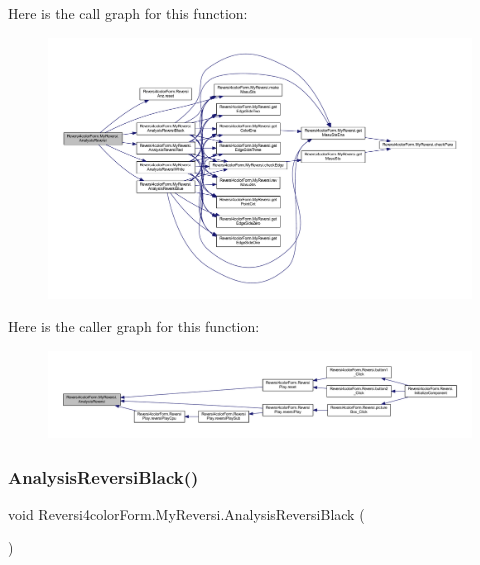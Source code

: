 Here is the call graph for this function\+:\nopagebreak
\begin{figure}[H]
\begin{center}
\leavevmode
\includegraphics[width=350pt]{class_reversi4color_form_1_1_my_reversi_ade9840e10e80b3e908a406efe9ee1372_cgraph}
\end{center}
\end{figure}
Here is the caller graph for this function\+:\nopagebreak
\begin{figure}[H]
\begin{center}
\leavevmode
\includegraphics[width=350pt]{class_reversi4color_form_1_1_my_reversi_ade9840e10e80b3e908a406efe9ee1372_icgraph}
\end{center}
\end{figure}
\mbox{\label{class_reversi4color_form_1_1_my_reversi_ae4c0b7e9a3cedba827facf1d96b654f0}} 
\subsubsection{\texorpdfstring{Analysis\+Reversi\+Black()}{AnalysisReversiBlack()}}
{\footnotesize\ttfamily void Reversi4color\+Form.\+My\+Reversi.\+Analysis\+Reversi\+Black (\begin{DoxyParamCaption}{ }\end{DoxyParamCaption})\hspace{0.3cm}{\ttfamily [private]}}



